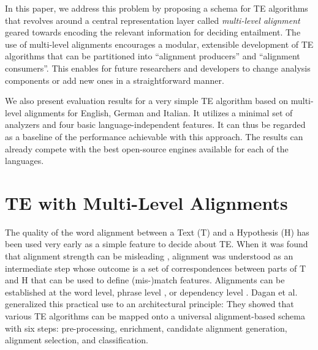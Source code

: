 \documentclass[11pt,letterpaper]{article}
\begin{document}


In this paper, we address this problem by proposing a schema for TE
algorithms that revolves around a central representation layer called
{\em multi-level alignment} geared towards encoding the relevant
information for deciding entailment. The use of multi-level
alignments encourages a modular, extensible development of TE
algorithms that can be partitioned into ``alignment producers'' and
``alignment consumers''. This enables for future researchers
and developers to change analysis components or add new ones in a
straightforward manner.

We also present evaluation results for a very simple TE algorithm
based on multi-level alignments for English, German and Italian. It
utilizes a minimal set of analyzers and four basic
language-independent features. It can thus be regarded as a baseline
of the performance achievable with this approach.  The results can
already compete with the best open-source engines available for each
of the languages.

\section{TE with Multi-Level Alignments}

The quality of the word alignment between a Text (T) and a Hypothesis
(H) has been used very early as a simple feature to decide about
TE. When it was found that alignment strength  can be
misleading \cite{maccartney-EtAl:2006:HLT-NAACL06-Main}, alignment was
understood as an intermediate step whose outcome is a set of
correspondences between parts of T and H that can be used to define
(mis-)match features. Alignments can be established at the word level,
phrase level \cite{MacCartney:EMNLP08}, or dependency level
\cite{dinu-wang:2009:EACL}. Dagan et al. 
generalized this practical use to an architectural principle: They
showed that various TE algorithms can be mapped onto a universal
alignment-based schema with six steps: pre-processing, enrichment,
candidate alignment generation, alignment selection, and
classification.
\end{document}
